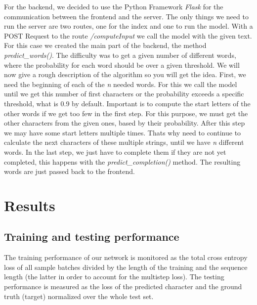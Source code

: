 \documentclass[11pt,a4paper,bibliography=totocnumbered,listof=totocnumbered]{scrartcl}
\begin{document}
For the backend, we decided to use the Python Framework \textit{Flask} for the communication between the frontend and the server. The only things we need to run the server are two routes, one for the index and one to run the model. With a POST Request to the route \textit{/computeInput} we call the model with the given text. For this case we created the main part of the backend, the method \textit{predict\_words()}. The difficulty was to get a given number of different words, where the probability for each word should be over a given threshold. We will now give a rough description of the algorithm so you will get the idea. First, we need the beginning of each of the \textit{n} needed words. For this we call the model until we get this number of first characters or the probability exceeds a specific threshold, what is 0.9 by default. Important is to compute the start letters of the other words if we get too few in the first step. For this purpose, we must get the other characters from the given ones, based by their probability. After this step we may have some start letters multiple times. Thats why need to continue to calculate the next characters of these multiple strings, until we have \textit{n} different words. In the last step, we just have to complete them if they are not yet completed, this happens with the \textit{predict\_completion()} method. The resulting words are just passed back to the frontend.

\pagebreak

%
\section{Results} \label{sec:res}

\subsection{Training and testing performance}
The training performance of our network is monitored as the total cross entropy loss of all sample batches divided by the length of the training and the sequence length (the latter in order to account for the multistep loss). The testing performance is measured as the loss of the predicted character and the ground truth (target) normalized over the whole test set. 
\end{document}
